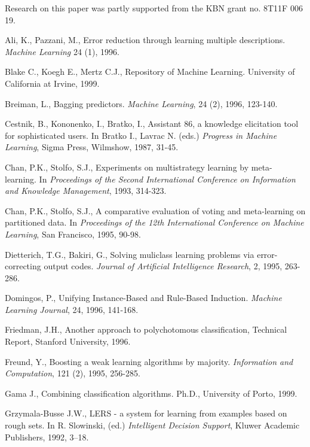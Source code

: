 \documentclass{article}
\begin{document}
\newline Research on this paper was
partly supported from the KBN grant no. 8T11F 006 19.

\begin{thebibliography}{99}


  Ali, K., Pazzani, M., Error reduction through learning
multiple descriptions. {\em Machine Learning} 24 (1), 1996.

  Blake C., Koegh E., Mertz C.J., Repository of Machine Learning.
University of California at Irvine, 1999.

  Breiman, L., Bagging predictors. {\em Machine Learning}, 24
(2), 1996, 123-140.

  Cestnik, B., Kononenko, I., Bratko, I., Assistant 86, a
knowledge elicitation tool for sophisticated users. In Bratko I.,
Lavrac N. (eds.) {\em Progress in Machine Learning}, Sigma Press,
Wilmshow, 1987, 31-45.

  Chan, P.K., Stolfo, S.J., Experiments on multistrategy
learning by meta- learning. In {\em Proceedings of the Second
International Conference on Information and Knowledge Management},
1993, 314-323.

  Chan, P.K., Stolfo, S.J., A comparative evaluation of voting
and meta-learning on partitioned data. In {\em Proceedings of the
12th International Conference on Machine Learning}, San Francisco,
1995, 90-98.


  Dietterich, T.G., Bakiri, G., Solving muliclass learning
problems via error- correcting output codes. {\em Journal of Artificial
Intelligence Research}, 2, 1995, 263-286.

  Domingos, P., Unifying Instance-Based and Rule-Based
Induction. {\em Machine Learning Journal}, 24, 1996, 141-168.

  Friedman, J.H., Another approach to polychotomous
classification, Technical Report, Stanford University, 1996.

  Freund, Y., Boosting a weak learning algorithms by
majority. {\em Information and Computation}, 121 (2), 1995, 256-285.

  Gama J., Combining classification algorithms. Ph.D.,
University of Porto, 1999.

  Grzymala-Busse J.W., LERS - a system for learning from
examples based on rough sets. In R. Slowinski, (ed.) {\em Intelligent
Decision Support}, Kluwer Academic Publishers, 1992, 3--18.


\end{thebibliography}
\end{document}
